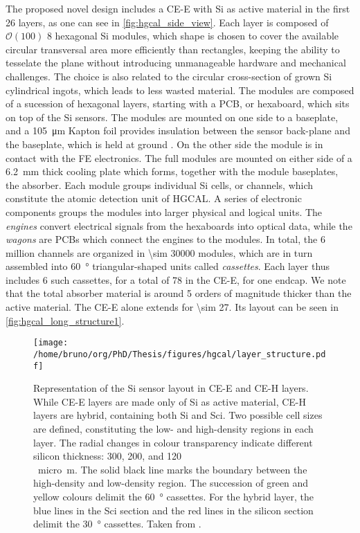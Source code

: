 \documentclass[11pt]{article}
\begin{document}
The proposed novel design includes a \ac{CE-E} with \ac{Si} as active material in the first \num{26} layers, as one can see in \cref{fig:hgcal_side_view}.
Each layer is composed of \(\mathcal{O}(100)\) \SI{8}{\inch} hexagonal \ac{Si} modules, which shape is chosen to cover the available circular transversal area more efficiently than rectangles, keeping the ability to tesselate the plane without introducing unmanageable hardware and mechanical challenges.
The choice is also related to the circular cross-section of grown \ac{Si} cylindrical ingots, which leads to less wasted material.
The modules are composed of a sucession of hexagonal layers, starting with a \ac{PCB}, or hexaboard, which sits on top of the \ac{Si} sensors.
The modules are mounted on one side to a  baseplate, and a \SI{105}{\micro\meter} Kapton foil provides insulation between the sensor back-plane and the baseplate, which is held at ground \cite{hgcalTDR}.
On the other side the module is in contact with the \ac{FE} electronics.
The full modules are mounted on either side of a \SI{6.2}{\mm} thick  cooling plate which forms, together with the module baseplates, the absorber.
Each module groups individual \ac{Si} cells, or channels, which constitute the atomic detection unit of \ac{HGCAL}.
A series of electronic components groups the modules into larger physical and logical units.
The \emph{engines} convert electrical signals from the hexaboards into optical data, while the \emph{wagons} are \acp{PCB} which connect the engines to the modules.
In total, the \num{6} million channels are organized in \num{\sim 30000} modules, which are in turn assembled into \SI{60}{\degree} triangular-shaped units called \textit{cassettes}.
Each layer thus includes \num{6} such cassettes, for a total of \num{78} in the \ac{CE-E}, for one endcap.
We note that the total absorber material is around \num{5} orders of magnitude thicker than the active material.
The CE-E alone extends for \SI{\sim 27}{\radl}.
Its layout can be seen in \cref{fig:hgcal_long_structure1}.

\begin{figure}
\begin{center}
\texttt{[image: /home/bruno/org/PhD/Thesis/figures/hgcal/layer\_structure.pdf]}
\end{center}
\caption{\label{fig:layers_layout}Representation of the \ac{Si} sensor layout in \ac{CE-E} and \ac{CE-H} layers. While \ac{CE-E} layers are made only of \ac{Si} as active material, \ac{CE-H} layers are hybrid, containing both \ac{Si} and \ac{Sci}. Two possible cell sizes are defined, constituting the low- and high-density regions in each layer. The radial changes in colour transparency indicate different silicon thickness: \num{300}, \num{200}, and \SI{120}{\\micro\meter}. The solid black line marks the boundary between the high-density and low-density region. The succession of green and yellow colours delimit the \SI{60}{\degree} cassettes. For the hybrid layer, the blue lines in the \ac{Sci} section and the red lines in the silicon section delimit the \SI{30}{\degree} cassettes. Taken from \cite{tarabini_thesis}.}
\end{figure}
\end{document}
